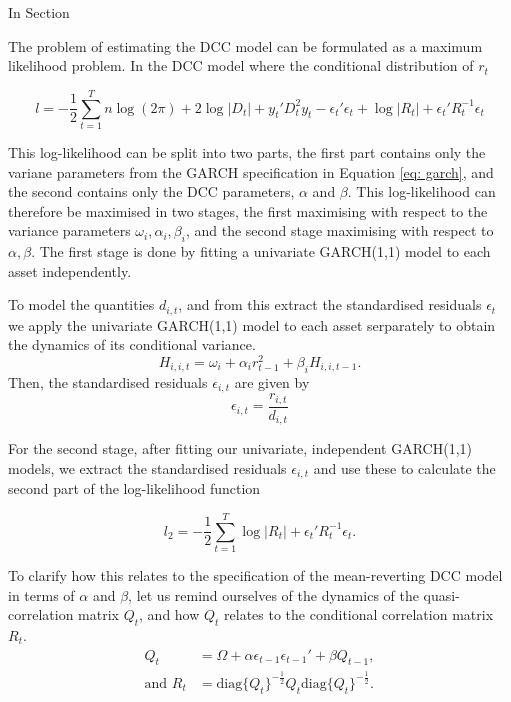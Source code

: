 \documentclass{article} %
\numberwithin{equation}{section} %
\numberwithin{figure}{section} %
\numberwithin{table}{section} %
\begin{document}
In Section

The problem of estimating the DCC model can be formulated as a maximum likelihood problem. In the DCC model where the conditional distribution of $r_t$

\begin{equation}\label{eq: loglik}
l = - \frac{1}{2} \sum\limits_{t=1}^T n \log(2\pi) + 2 \log |D_t| + y_t' D_t^2y_t - \epsilon_t' \epsilon_t + \log |R_t| + \epsilon_t'R_t^{-1}\epsilon_t
\end{equation}

This log-likelihood can be split into two parts, the first part contains only the variane parameters from the GARCH specification in Equation \ref{eq: garch}, and the second contains only the DCC parameters, $\alpha$ and $\beta$. This log-likelihood can therefore be maximised in two stages, the first maximising with respect to the variance parameters $\omega_i, \alpha_i, \beta_i$, and the second stage maximising with respect to $\alpha, \beta$. The first stage is done by fitting a univariate GARCH(1,1) model to each asset independently.

To model the quantities $d_{i,t}$, and from this extract the standardised residuals $\epsilon_t$ we apply the univariate GARCH(1,1) model to each asset serparately to obtain the dynamics of its conditional variance.
\begin{equation}\label{eq: garch}
  H_{i,i,t} = \omega_i + \alpha_i r_{t-1}^2 + \beta_i H_{i,i,t-1}.
\end{equation}
 Then, the standardised residuals $\epsilon _{i,t}$ are given by
 \begin{equation}
\epsilon_{i,t} = \frac{r_{i,t}}{d_{i,t}}
 \end{equation}

For the second stage, after fitting our univariate, independent GARCH(1,1) models, we extract the standardised residuals $\epsilon_{i,t}$ and use these to calculate the second part of the log-likelihood function

\begin{equation}\label{eq: L2}
l_2 = -\frac{1}{2}\sum\limits_{t=1}^{T} \log |R_t| + \epsilon_t'R_t^{-1}\epsilon_t.
\end{equation}

To clarify how this relates to the specification of the mean-reverting DCC model in terms of $\alpha$ and $\beta$, let us remind ourselves of the dynamics of the quasi-correlation matrix $Q_t$, and how $Q_t$ relates to the conditional correlation matrix $R_t$.
\begin{align}
Q_t
&= \Omega + \alpha \epsilon_{t-1}\epsilon_{t-1}' + \beta Q_{t-1}, \\
\text{and } R_t
&= \text{diag}\{Q_t\}^{-\frac{1}{2}} Q_t \text{diag}\{Q_t\}^{-\frac{1}{2}}.
\end{align}
\end{document}
